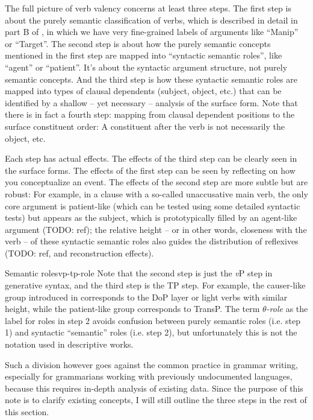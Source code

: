 \documentclass[UTF8, a4paper, oneside, scheme=plain]{ctexrep}
\newcommand*{\term}[1]{\emph{#1}}
\newcommand{\vP}{\textit{v}P}
\begin{document}
The full picture of verb valency concerns at least three steps.
The first step is about the purely semantic classification of verbs,
which is described in detail in part B of \citet{dixon2005semantic},
in which we have very fine-grained labels of arguments like ``Manip'' or ``Target''.
The second step is about how the purely semantic concepts mentioned in the first step 
are mapped into ``syntactic semantic roles'',
like ``agent'' or ``patient''.
It's about the syntactic argument structure, 
not purely semantic concepts.
And the third step is how these syntactic semantic roles are mapped into 
types of clausal dependents (subject, object, etc.) 
that can be identified by a shallow -- yet necessary -- analysis of the surface form.
Note that there is in fact a fourth step:
mapping from clausal dependent positions to the surface constituent order:
A constituent after the verb is not necessarily the object, etc. 

Each step has actual effects.
The effects of the third step can be clearly seen in the surface forms.
The effects of the first step can be seen by reflecting on how you conceptualize an event.
The effects of the second step are more subtle but are robust:
For example, in a clause with a so-called unaccusative main verb,
the only core argument is patient-like (which can be tested using some detailed syntactic tests)
but appears as the subject,
which is prototypically filled by an agent-like argument (TODO: ref);
the relative height -- or in other words, closeness with the verb -- of these syntactic semantic roles 
also guides the distribution of reflexives (TODO: ref, and reconstruction effects).

\begin{theorybox}{Semantic roles}{vp-tp-role}
    Note that the second step is just the \vP{} step in generative syntax,
    and the third step is the TP step.
    For example, the causer-like group introduced in 
    corresponds to the DoP layer or light verbs with similar height,
    while the patient-like group corresponds to TransP.
    The term \term{$\theta$-role} as the label for roles in step 2 avoids confusion 
    between purely semantic roles (i.e. step 1) and syntactic ``semantic'' roles (i.e. step 2),
    but unfortunately this is not the notation used in descriptive works.
\end{theorybox}

Such a division however goes against the common practice in grammar writing,
especially for grammarians working with previously undocumented languages,
because this requires in-depth analysis of existing data.
Since the purpose of this note is to clarify existing concepts,
I will still outline the three steps in the rest of this section.
\end{document}
